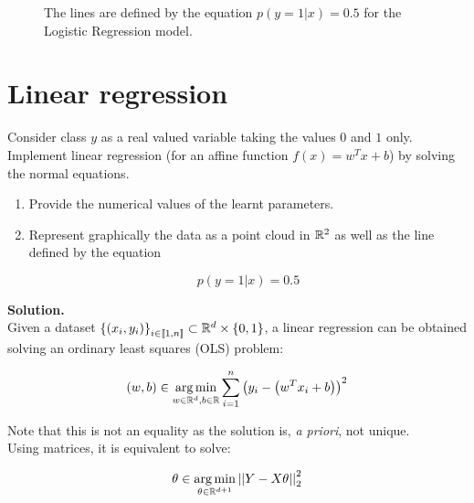 \documentclass[a4paper, 11pt]{report}
\begin{document}
\begin{enumerate}[label=\alph*]
\begin{figure}[!htb]
          \label{fig:logreg_c}
        \endminipage
        \caption{The lines are defined by the equation $p(y=1|x)=0.5$ for the Logistic Regression model.}
        \label{fig:log-reg-plot}
        \end{figure}
\end{enumerate}

\section{Linear regression}

Consider class $y$ as a real valued variable taking the values $0$ and $1$ only. Implement linear regression (for an affine function $f(x) = w^{T}x + b$) by solving the normal equations.

\begin{enumerate}[label=\alph*]
    \item Provide the numerical values of the learnt parameters.
    
    \item Represent graphically the data as a point cloud in $\mathbb{R}^{2}$ as well as the line defined by the equation
    
    \begin{equation*}
        p \left( y = 1 | x \right) = 0.5
    \end{equation*}
\end{enumerate}

\textbf{Solution.} \\

Given a dataset $\left\{ \left( x_{i}, y_{i} \right) \right\}_{i \in [\![ 1, n ]\!]} \subset \mathbb{R}^{d} \times \left\{ 0, 1 \right\}$, a linear regression can be obtained solving an ordinary least squares (OLS) problem:
    
\begin{equation*}
\left( w, b \right) \in \underset{w \in \mathbb{R}^{d}, b \in \mathbb{R}}{\arg\min} \sum_{i=1}^{n} \left( y_{i} - \left( w^{T}x_{i} + b \right) \right)^{2}    
\end{equation*}

Note that this is not an equality as the solution is, \textit{a priori}, not unique. \\

Using matrices, it is equivalent to solve:
    
\begin{equation*}
    \theta \in \underset{\theta \in \mathbb{R}^{d+1}}{\arg\min} \left|\left| Y - X \theta \right|\right|_{2}^{2}
\end{equation*}
    
\end{document}

